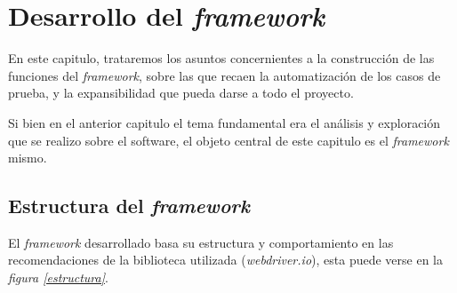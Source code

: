 \chapter{Desarrollo del \emph{framework}}

En este capitulo, trataremos los asuntos concernientes a la construcción de las
funciones del \emph{framework}, sobre las que recaen la automatización de los
casos de prueba, y la expansibilidad que pueda darse a todo el proyecto.

Si bien en el anterior capitulo el tema fundamental era el análisis y
exploración que se realizo sobre el software, el objeto central de este
capitulo es el \emph{framework} mismo.

\section{Estructura del \emph{framework}}
El \emph{framework} desarrollado basa su estructura y comportamiento en las
recomendaciones de la biblioteca utilizada (\emph{webdriver.io}), esta puede
verse en la \emph{figura \ref{estructura}}.

